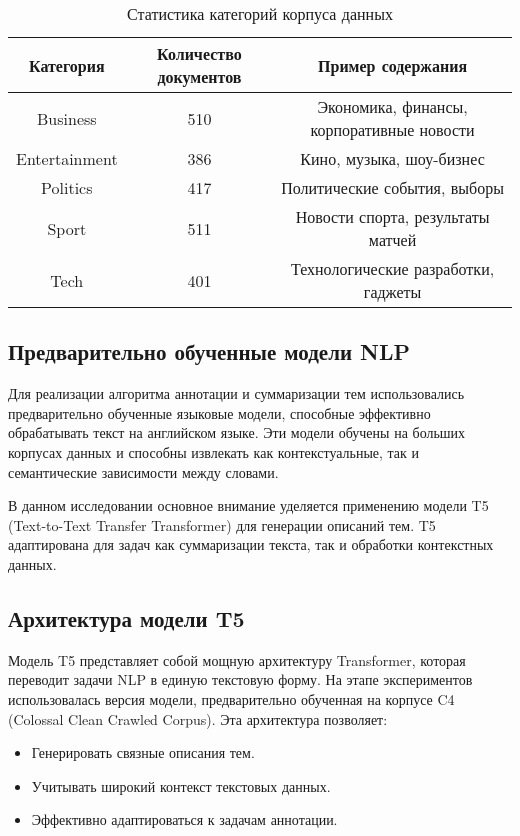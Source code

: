 \documentclass{article}
\begin{document}
\begin{table}[h]
\centering
\begin{tabular}{|c|c|c|}
\hline
Категория & Количество документов & Пример содержания\\
\hline
Business  & 510  & Экономика, финансы, корпоративные новости \\
 Entertainment & 386 & Кино, музыка, шоу-бизнес \\
 Politics & 417  & Политические события, выборы  \\
 Sport & 511  & Новости спорта, результаты матчей \\
 Tech & 401 & Технологические разработки, гаджеты   \\
\hline
\end{tabular}
\caption{Статистика категорий корпуса данных}
\label{fig:table}
\end{table}

\subsection{Предварительно обученные модели NLP}

Для реализации алгоритма аннотации и суммаризации тем использовались предварительно обученные языковые модели, способные эффективно обрабатывать текст на английском языке. Эти модели обучены на больших корпусах данных и способны извлекать как контекстуальные, так и семантические зависимости между словами.

В данном исследовании основное внимание уделяется применению модели T5 (Text-to-Text Transfer Transformer) для генерации описаний тем. \cite{vaswani2017attention} T5 адаптирована для задач как суммаризации текста, так и обработки контекстных данных.

\subsection{Архитектура модели T5}

Модель T5 представляет собой мощную архитектуру Transformer, которая переводит задачи NLP в единую текстовую форму. На этапе экспериментов использовалась версия модели, предварительно обученная на корпусе C4 (Colossal Clean Crawled Corpus). \cite{5langston2024automated} Эта архитектура позволяет:
\begin{itemize}
    \item Генерировать связные описания тем.
    \item Учитывать широкий контекст текстовых данных.
    \item Эффективно адаптироваться к задачам аннотации.
\end{itemize}
\end{document}
